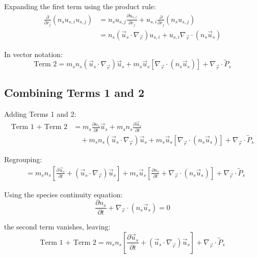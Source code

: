 Expanding the first term using the product rule:
\begin{align*}
\frac{\partial}{\partial r_j} (n_s u_{s,i} u_{s,j}) &= n_s u_{s,j} \frac{\partial u_{s,i}}{\partial r_j} + u_{s,i} \frac{\partial}{\partial r_j}(n_s u_{s,j})  \\
&= n_s (\vec{u}_s \cdot \nabla_{\vec{r}}) u_{s,i} + u_{s,i} \nabla_{\vec{r}} \cdot (n_s \vec{u}_s)
\end{align*}

In vector notation:
\begin{equation*}
\text{Term 2} = m_s n_s (\vec{u}_s \cdot \nabla_{\vec{r}}) \vec{u}_s + m_s \vec{u}_s [\nabla_{\vec{r}} \cdot (n_s \vec{u}_s)] + \nabla_{\vec{r}} \cdot \overleftrightarrow{P}_s
\end{equation*}

\subsection{Combining Terms 1 and 2}

Adding Terms 1 and 2:
\begin{align*}
\text{Term 1 + Term 2} &= m_s \frac{\partial n_s}{\partial t} \vec{u}_s + m_s n_s \frac{\partial \vec{u}_s}{\partial t}  \\
&\quad + m_s n_s (\vec{u}_s \cdot \nabla_{\vec{r}}) \vec{u}_s + m_s \vec{u}_s [\nabla_{\vec{r}} \cdot (n_s \vec{u}_s)] + \nabla_{\vec{r}} \cdot \overleftrightarrow{P}_s
\end{align*}

Regrouping:
\begin{align*}
&= m_s n_s \left[ \frac{\partial \vec{u}_s}{\partial t} + (\vec{u}_s \cdot \nabla_{\vec{r}}) \vec{u}_s \right] + m_s \vec{u}_s \left[ \frac{\partial n_s}{\partial t} + \nabla_{\vec{r}} \cdot (n_s \vec{u}_s) \right] + \nabla_{\vec{r}} \cdot \overleftrightarrow{P}_s
\end{align*}

Using the species continuity equation:
\begin{equation*}
\frac{\partial n_s}{\partial t} + \nabla_{\vec{r}} \cdot (n_s \vec{u}_s) = 0
\end{equation*}

the second term vanishes, leaving:
\begin{equation*}
\text{Term 1 + Term 2} = m_s n_s \left[ \frac{\partial \vec{u}_s}{\partial t} + (\vec{u}_s \cdot \nabla_{\vec{r}}) \vec{u}_s \right] + \nabla_{\vec{r}} \cdot \overleftrightarrow{P}_s
\end{equation*}

